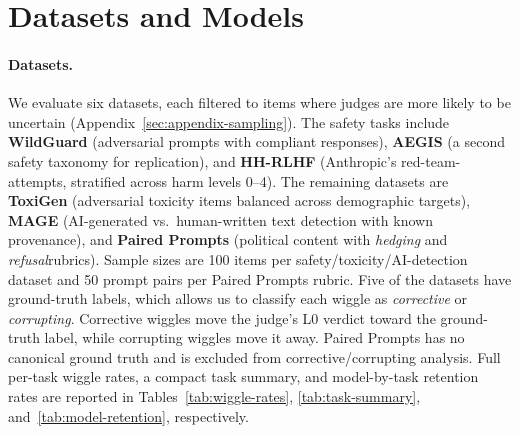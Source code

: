 \section{Datasets and Models}
\label{sec:dataset}

\paragraph{Datasets.} We evaluate six datasets, each filtered to items where judges are more likely to be uncertain (Appendix~\ref{sec:appendix-sampling}).
The safety tasks include \textbf{WildGuard} \citep{wildguardmix2024} (adversarial prompts with compliant responses),
\textbf{AEGIS} \citep{aegis2024} (a second safety taxonomy for replication), and \textbf{HH-RLHF} \citep{ganguli2022redteam} 
(Anthropic's red-team-attempts, stratified across harm levels 0--4). The remaining datasets are \textbf{ToxiGen} 
\citep{hartvigsen2022toxigen} (adversarial toxicity items balanced across demographic targets), \textbf{MAGE} 
\citep{li2024mage} (AI-generated vs.\ human-written text detection with known provenance), and \textbf{Paired Prompts} 
\citep{anthropicPoliticalNeutrality} (political content with \emph{hedging} and \emph{refusal}rubrics).
Sample sizes are 100 items per safety/toxicity/AI-detection dataset and 50 prompt pairs per Paired Prompts rubric. 
Five of the datasets have ground-truth labels, which allows us to classify each wiggle as \emph{corrective} or \emph{corrupting}.
Corrective wiggles move the judge's L0 verdict toward the ground-truth label, while corrupting wiggles move it away.
Paired Prompts has no canonical ground truth and is excluded from corrective/corrupting analysis.
Full per-task wiggle rates, a compact task summary, and model-by-task retention rates are reported in
Tables~\ref{tab:wiggle-rates}, \ref{tab:task-summary}, and~\ref{tab:model-retention}, respectively.

